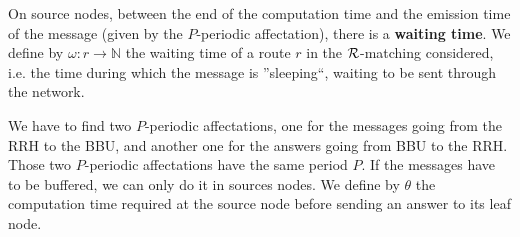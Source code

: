 \documentclass[a4paper,10pt]{article}
\begin{document}
    \begin{center}
    \end{center}


    On source nodes, between the end of the computation time and the emission time of the message (given by the $P$-periodic affectation), there is a {\bf waiting time}. 
    We define by $\omega: r \rightarrow \mathbb{N}$ the waiting time of a route $r$ in the ${\cal R}$-matching considered, i.e. the time during which the
    message is ''sleeping``, waiting to be sent through the network.


    We have to find two $P$-periodic affectations, one for the messages going from the RRH to the BBU, and another one for the answers going from BBU to the RRH. Those two $P$-periodic affectations have the same period $P$. 
    If the messages have to be buffered, we can only do it in sources nodes.
    We define by $\theta$ the computation time required at the source node before sending an answer to its leaf node.
\end{document}
